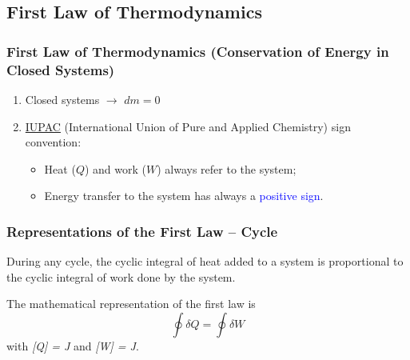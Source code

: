 \documentclass[10pt,compress]{beamer}
\begin{document}
\subsection{First Law of Thermodynamics}
\begin{frame}
 \frametitle{First Law of Thermodynamics (Conservation of Energy in Closed Systems)}
   \begin{enumerate} 
      \item<1-> Closed systems $\longrightarrow$ $dm = 0$
      \item<2-> \href{http://www.iupac.org/}{IUPAC} (International Union of Pure and Applied Chemistry) sign convention:
         \begin{itemize}
            \item<2-> Heat ($Q$) and work ($W$)  always refer to the system;
            \item<2-> Energy transfer to the system has always a \textcolor{blue}{positive sign}.
         \end{itemize}
   \end{enumerate}
\normalsize
\end{frame}


\begin{frame}
 \frametitle{Representations of the First Law -- Cycle}

 \begin{block}{}During any cycle, the cyclic integral of heat added to a system is proportional to the cyclic integral of work done by the system.\end{block}

 The mathematical representation of the first law is
 \begin{equation}
  \displaystyle\oint \delta Q = \displaystyle\oint \delta W
  \label{Module00:first_law}
 \end{equation}
 with {\it [Q] = J} and {\it [W] = J}.

\end{frame}
\end{document}
